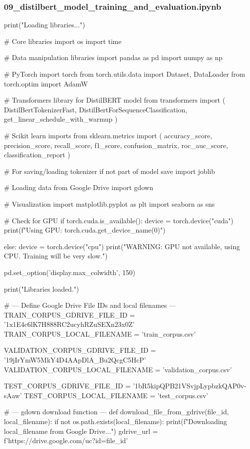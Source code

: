 \subsubsection*{09\_distilbert\_model\_training\_and\_evaluation.ipynb}

\begin{ffcode}
print("Loading libraries...")

# Core libraries
import os
import time

# Data manipulation libraries
import pandas as pd
import numpy as np

# PyTorch
import torch
from torch.utils.data import Dataset, DataLoader
from torch.optim import AdamW

# Transformers library for DistilBERT model
from transformers import (
    DistilBertTokenizerFast,
    DistilBertForSequenceClassification,
    get_linear_schedule_with_warmup
)

# Scikit learn imports
from sklearn.metrics import (
    accuracy_score,
    precision_score,
    recall_score,
    f1_score,
    confusion_matrix,
    roc_auc_score,
    classification_report
)

# For saving/loading tokenizer if not part of model save
import joblib

# Loading data from Google Drive
import gdown

# Visualization
import matplotlib.pyplot as plt
import seaborn as sns

# Check for GPU
if torch.cuda.is_available():
    device = torch.device("cuda")
    print(f"Using GPU: {torch.cuda.get_device_name(0)}")

else:
    device = torch.device("cpu")
    print("WARNING: GPU not available, using CPU. Training will be very slow.")

pd.set_option('display.max_colwidth', 150)

print("Libraries loaded.")

# --- Define Google Drive File IDs and local filenames ---
TRAIN_CORPUS_GDRIVE_FILE_ID = '1x1E4c6lK7H888RC2ucyhRZuSEXn23x0Z'
TRAIN_CORPUS_LOCAL_FILENAME = 'train_corpus.csv'

VALIDATION_CORPUS_GDRIVE_FILE_ID = '19jIrYmW5MkY4D4AApDlA_Bu2QcgC5HcP'
VALIDATION_CORPUS_LOCAL_FILENAME = 'validation_corpus.csv'

TEST_CORPUS_GDRIVE_FILE_ID = '1bR5kipQPB21VSvjpLypbzkQAP0v-sAaw'
TEST_CORPUS_LOCAL_FILENAME = 'test_corpus.csv'

# --- gdown download function ---
def download_file_from_gdrive(file_id, local_filename):
    if not os.path.exists(local_filename):
        print(f"Downloading {local_filename} from Google Drive...")
        gdrive_url = f'https://drive.google.com/uc?id={file_id}'


\end{ffcode}
